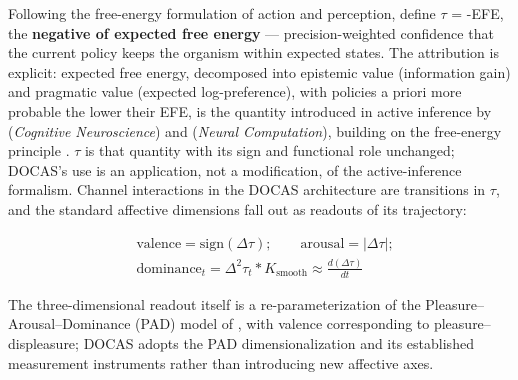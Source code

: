 \documentclass[11pt,twocolumn]{article}
\theoremstyle{plain}
\begin{document}
Following the free-energy formulation of action and perception, define $\tau$ = -EFE, the \textbf{negative of expected free energy} — precision-weighted confidence that the current policy keeps the organism within expected states. The attribution is explicit: expected free energy, decomposed into epistemic value (information gain) and pragmatic value (expected log-preference), with policies a priori more probable the lower their EFE, is the quantity introduced in active inference by \citet{friston2015} (\textit{Cognitive Neuroscience}) and \citet{friston2017} (\textit{Neural Computation}), building on the free-energy principle \citep{friston2010}. $\tau$ is that quantity with its sign and functional role unchanged; DOCAS's use is an application, not a modification, of the active-inference formalism. Channel interactions in the DOCAS architecture are transitions in $\tau$, and the standard affective dimensions fall out as readouts of its trajectory:

\begin{equation}
\begin{split}
&\mathrm{valence} = \mathrm{sign}(\Delta\tau); \qquad \mathrm{arousal} = |\Delta\tau|;\\
&\mathrm{dominance}_t = \Delta^2\tau_t * K_{\mathrm{smooth}} \approx \frac{d(\Delta\tau)}{dt}
\end{split}
\tag{1}\label{eq:readout}
\end{equation}

The three-dimensional readout itself is a re-parameterization of the Pleasure–Arousal–Dominance (PAD) model of \citet{mehrabian1974}, with valence corresponding to pleasure–displeasure; DOCAS adopts the PAD dimensionalization and its established measurement instruments rather than introducing new affective axes.
\end{document}
